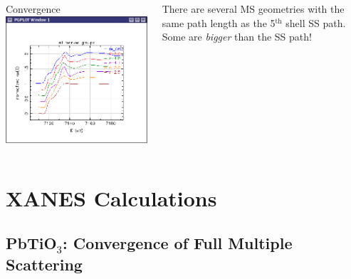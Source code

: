 \documentclass[10pt, xcolor=x11names, compress]{beamer}
\newcommand{\pto}{PbTiO$_3$}
\begin{document}
\begin{frame}
  \medskip
  
  \begin{columns}
    \begin{column}{0.4\linewidth}
      \begin{block}{Convergence}
        \includegraphics[width=\linewidth]{images/xanes_convergence}
      \end{block}
    \end{column}
    \begin{column}{0.6\linewidth}
      There are several MS geometries with the same path length as the
      5$^{\mathrm{th}}$ shell SS path.  Some are \emph{bigger} than
      the SS path!
    \end{column}
  \end{columns}
\end{frame}






\section[XANES]{XANES Calculations}
\subsection[Convergence of XANES]{\pto: Convergence of Full Multiple Scattering}
\end{document}
